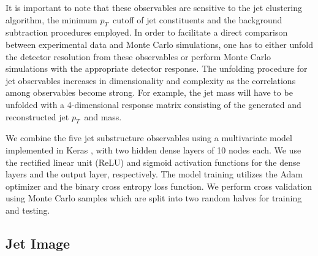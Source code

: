 \documentclass[notoc,preprintnumbers]{JHEP3}
\newcommand{\pt}{$p_{T}$}
\begin{document}
It is important to note that these observables are sensitive to the jet clustering algorithm, the minimum \pt ~cutoff of jet constituents and the background subtraction procedures employed. In order to facilitate a direct comparison between experimental data and Monte Carlo simulations, one has to either unfold the detector resolution from these observables or perform Monte Carlo simulations with the appropriate detector response. The unfolding procedure for jet observables increases in dimensionality and complexity as the correlations among observables become strong. For example, the jet mass will have to be unfolded with a 4-dimensional response matrix consisting of the generated and reconstructed jet \pt ~and mass.

We combine the five jet substructure observables using a multivariate model implemented in Keras \cite{keras}, with two hidden dense layers of 10 nodes each. We use the rectified linear unit (ReLU) \cite{nair2010rectified} and sigmoid activation functions for the dense layers and the output layer, respectively. The model training utilizes the Adam optimizer \cite{adam} and the binary cross entropy loss function. We perform cross validation using Monte Carlo samples which are split into two random halves for training and testing.

\subsection{Jet Image}
\label{sec:image}
\end{document}
